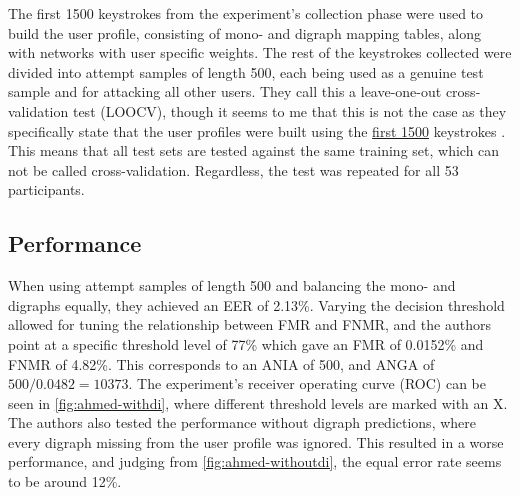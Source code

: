 \documentclass[informationsecurity]{gucmasterproject}
\begin{document}
The first 1500 keystrokes from the experiment's collection phase were used to build the user profile, consisting of mono- and digraph mapping tables, along with networks with user specific weights.
The rest of the keystrokes collected were divided into attempt samples of length 500, each being used as a genuine test sample and for attacking all other users.
They call this a leave-one-out cross-validation test (LOOCV), though it seems to me that this is not the case as they specifically state that the user profiles were built using the \underline{first 1500} keystrokes \cite{Ahmed}.
This means that all test sets are tested against the same training set, which can not be called cross-validation.
Regardless, the test was repeated for all 53 participants.

\subsection{Performance}
\label{sec:ahmed-performance}
When using attempt samples of length 500 and balancing the mono- and digraphs equally, they achieved an EER of 2.13\%.
Varying the decision threshold allowed for tuning the relationship between FMR and FNMR, and the authors point at a specific threshold level of 77\% which gave an FMR of 0.0152\% and FNMR of 4.82\%.
This corresponds to an ANIA of 500, and ANGA of $500 / 0.0482 = 10373$.
The experiment's receiver operating curve (ROC) can be seen in \cref{fig:ahmed-withdi}, where different threshold levels are marked with an X.
The authors also tested the performance without digraph predictions, where every digraph missing from the user profile was ignored.
This resulted in a worse performance, and judging from \cref{fig:ahmed-withoutdi}, the equal error rate seems to be around 12\%.
\end{document}
